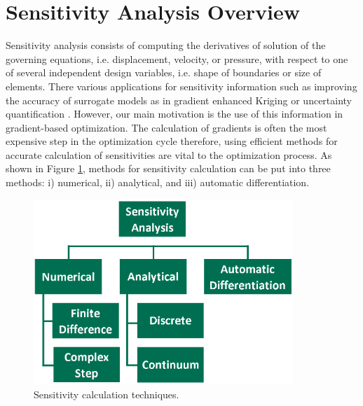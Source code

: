 \section{Sensitivity Analysis Overview}
Sensitivity analysis consists of computing the derivatives of solution of the governing equations, i.e. displacement, velocity, or pressure, with respect to one of several independent design variables, i.e. shape of boundaries or size of elements. There various applications for sensitivity information such as improving the accuracy of surrogate models as in gradient enhanced Kriging \cite{han2013improving} or uncertainty quantification \cite{pettit2004uncertainty}. However, our main motivation is the use of this information in gradient-based optimization. The calculation of gradients is often the most expensive step in the optimization cycle therefore, using efficient methods for accurate calculation of sensitivities are vital to the optimization process. As shown in Figure \ref{fig:C1_sensitivityTaxonomy}, methods for sensitivity calculation can be put into three methods: i) numerical, ii) analytical, and iii) automatic differentiation.

\begin{figure}[h]
	\centering
	\includegraphics[height=7.00cm]{Chapter_1/figure/sensitivity_taxonomy.png}
	\caption{Sensitivity calculation techniques.}
	\label{fig:C1_sensitivityTaxonomy}
\end{figure}

